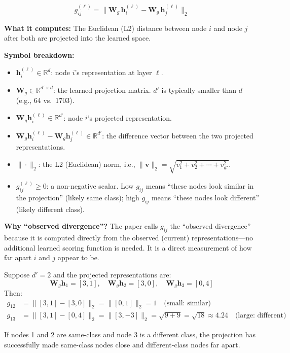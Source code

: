 \documentclass[11pt,a4paper]{article}
\newcommand{\R}{\mathbb{R}}
\newcommand{\bW}{\mathbf{W}}
\newcommand{\bh}{\mathbf{h}}
\theoremstyle{definition}
\theoremstyle{plain}
\begin{document}
\begin{equation}
  g_{ij}^{(\ell)} = \|\bW_g\, \bh_i^{(\ell)} - \bW_g\, \bh_j^{(\ell)}\|_2
  \tag{Eq.~2}
\end{equation}

\textbf{What it computes:}
The Euclidean (L2) distance between node $i$ and node $j$ after both are projected
into the learned space.

\textbf{Symbol breakdown:}
\begin{itemize}
  \item $\bh_i^{(\ell)} \in \R^d$: node $i$'s representation at layer $\ell$.
  \item $\bW_g \in \R^{d' \times d}$: the learned projection matrix.
    $d'$ is typically smaller than $d$ (e.g., 64 vs.\ 1703).
  \item $\bW_g \bh_i^{(\ell)} \in \R^{d'}$: node $i$'s projected representation.
  \item $\bW_g \bh_i^{(\ell)} - \bW_g \bh_j^{(\ell)} \in \R^{d'}$: the difference
    vector between the two projected representations.
  \item $\|\cdot\|_2$: the L2 (Euclidean) norm, i.e.,
    $\|\mathbf{v}\|_2 = \sqrt{v_1^2 + v_2^2 + \cdots + v_{d'}^2}$.
  \item $g_{ij}^{(\ell)} \geq 0$: a non-negative scalar. Low $g_{ij}$ means
    ``these nodes look similar in the projection'' (likely same class);
    high $g_{ij}$ means ``these nodes look different'' (likely different class).
\end{itemize}

\textbf{Why ``observed divergence''?}
The paper calls $g_{ij}$ the ``observed divergence'' because it is computed
directly from the observed (current) representations---no additional learned
scoring function is needed.
It is a direct measurement of how far apart $i$ and $j$ appear to be.

\begin{example}
Suppose $d' = 2$ and the projected representations are:
\[
  \bW_g \bh_1 = [3, 1], \quad \bW_g \bh_2 = [3, 0], \quad \bW_g \bh_3 = [0, 4]
\]
Then:
\begin{align*}
  g_{12} &= \|[3,1] - [3,0]\|_2 = \|[0, 1]\|_2 = 1 \quad\text{(small: similar)}\\
  g_{13} &= \|[3,1] - [0,4]\|_2 = \|[3, -3]\|_2 = \sqrt{9+9} = \sqrt{18} \approx 4.24 \quad\text{(large: different)}
\end{align*}

If nodes 1 and 2 are same-class and node 3 is a different class, the projection
has successfully made same-class nodes close and different-class nodes far apart.
\end{example}
\end{document}
